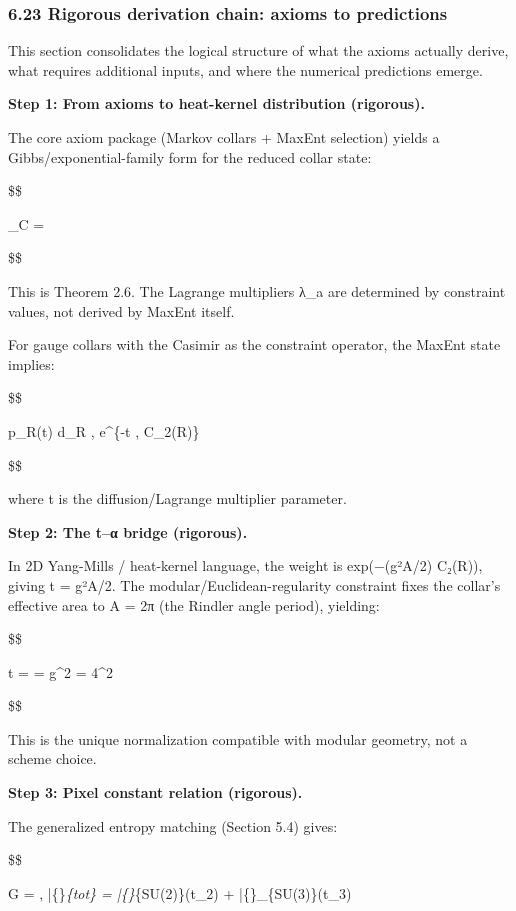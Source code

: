 \documentclass[11pt,a4paper]{article}
\theoremstyle{remark}
\begin{document}
\subsubsection{6.23 Rigorous derivation chain: axioms to predictions}\label{rigorous-derivation-chain-axioms-to-predictions}

This section consolidates the logical structure of what the axioms actually derive, what requires additional inputs, and where the numerical predictions emerge.

\textbf{Step 1: From axioms to heat-kernel distribution (rigorous).}

The core axiom package (Markov collars + MaxEnt selection) yields a Gibbs/exponential-family form for the reduced collar state:

\$\$

\rho\_C = 

\$\$

This is Theorem 2.6. The Lagrange multipliers λ\_a are determined by constraint values, not derived by MaxEnt itself.

For gauge collars with the Casimir as the constraint operator, the MaxEnt state implies:

\$\$

p\_R(t) \propto d\_R , e\^{}\{-t , C\_2(R)\}

\$\$

where t is the diffusion/Lagrange multiplier parameter.

\textbf{Step 2: The t--α bridge (rigorous).}

In 2D Yang-Mills / heat-kernel language, the weight is exp(−(g²A/2) C₂(R)), giving t = g²A/2. The modular/Euclidean-regularity constraint fixes the collar's effective area to A = 2π (the Rindler angle period), yielding:

\$\$

t =  = \pi g\^{}2 = 4\pi\^{}2 \alpha

\$\$

This is the unique normalization compatible with modular geometry, not a scheme choice.

\textbf{Step 3: Pixel constant relation (rigorous).}

The generalized entropy matching (Section 5.4) gives:

\$\$

G = , \qquad
\bar\{\ell\}\emph{\{\rm tot\} = \bar\{\ell\}}\{\rm SU(2)\}(t\_2) + \bar\{\ell\}\_\{\rm SU(3)\}(t\_3)
\end{document}
